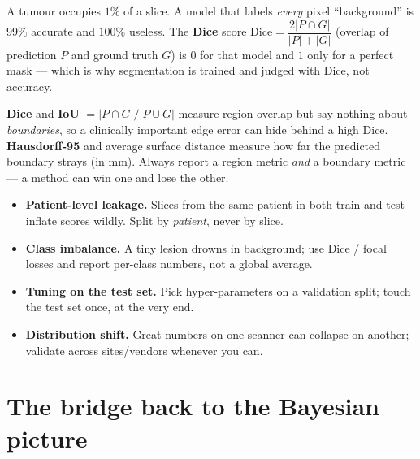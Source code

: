 \documentclass[11pt]{article}
\begin{document}
\begin{notebox}
A tumour occupies $1\%$ of a slice. A model that labels \emph{every} pixel
``background'' is $99\%$ accurate and $100\%$ useless. The \textbf{Dice} score
$\mathrm{Dice}=\dfrac{2|P\cap G|}{|P|+|G|}$ (overlap of prediction $P$ and ground
truth $G$) is $0$ for that model and $1$ only for a perfect mask --- which is why
segmentation is trained and judged with Dice, not accuracy.
\end{notebox}

\begin{notebox}
\textbf{Dice} and \textbf{IoU} $=|P\cap G|/|P\cup G|$ measure region overlap but
say nothing about \emph{boundaries}, so a clinically important edge error can hide
behind a high Dice. \textbf{Hausdorff-95} and average surface distance measure how
far the predicted boundary strays (in mm). Always report a region metric
\emph{and} a boundary metric --- a method can win one and lose the other.
\end{notebox}

\begin{notebox}
\begin{itemize}[nosep,leftmargin=*]
  \item \textbf{Patient-level leakage.} Slices from the same patient in both train
  and test inflate scores wildly. Split by \emph{patient}, never by slice.
  \item \textbf{Class imbalance.} A tiny lesion drowns in background; use Dice /
  focal losses and report per-class numbers, not a global average.
  \item \textbf{Tuning on the test set.} Pick hyper-parameters on a validation
  split; touch the test set once, at the very end.
  \item \textbf{Distribution shift.} Great numbers on one scanner can collapse on
  another; validate across sites/vendors whenever you can.
\end{itemize}
\end{notebox}

\section{The bridge back to the Bayesian picture}
\end{document}
